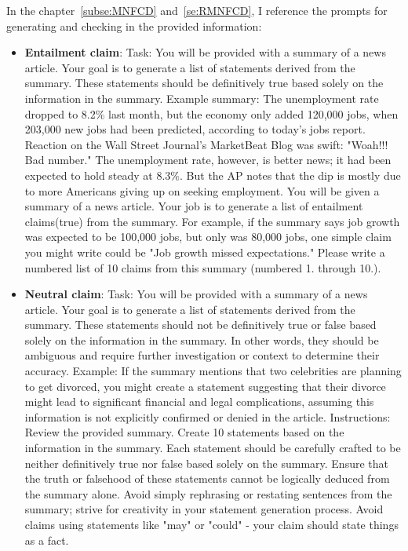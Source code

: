 In the chapter~\ref{subse:MNFCD} and~\ref{se:RMNFCD}, I reference the prompts for generating and checking in the provided information:

\begin{itemize}
    \item \textbf{Entailment claim}: Task: You will be provided with a summary of a news article. Your goal is to generate a list of statements derived from the summary. These statements should be definitively true based solely on the information in the summary. Example summary: The unemployment rate dropped to 8.2\% last month, but the economy only added 120,000 jobs, when 203,000 new jobs had been predicted, according to today's jobs report. Reaction on the Wall Street Journal's MarketBeat Blog was swift: "Woah!!! Bad number." The unemployment rate, however, is better news; it had been expected to hold steady at 8.3\%. But the AP notes that the dip is mostly due to more Americans giving up on seeking employment. You will be given a summary of a news article. Your job is to generate a list of entailment claims(true) from the summary. For example, if the summary says job growth was expected to be 100,000 jobs, but only was 80,000 jobs, one simple claim you might write could be "Job growth missed expectations." Please write a numbered list of 10 claims from this summary (numbered 1. through 10.).
    \item \textbf{Neutral claim}: Task: You will be provided with a summary of a news article. Your goal is to generate a list of statements derived from the summary. These statements should not be definitively true or false based solely on the information in the summary. In other words, they should be ambiguous and require further investigation or context to determine their accuracy. Example: If the summary mentions that two celebrities are planning to get divorced, you might create a statement suggesting that their divorce might lead to significant financial and legal complications, assuming this information is not explicitly confirmed or denied in the article. Instructions: Review the provided summary. Create 10 statements based on the information in the summary. Each statement should be carefully crafted to be neither definitively true nor false based solely on the summary. Ensure that the truth or falsehood of these statements cannot be logically deduced from the summary alone. Avoid simply rephrasing or restating sentences from the summary; strive for creativity in your statement generation process. Avoid claims using statements like "may" or "could" - your claim should state things as a fact.

\end{itemize}

